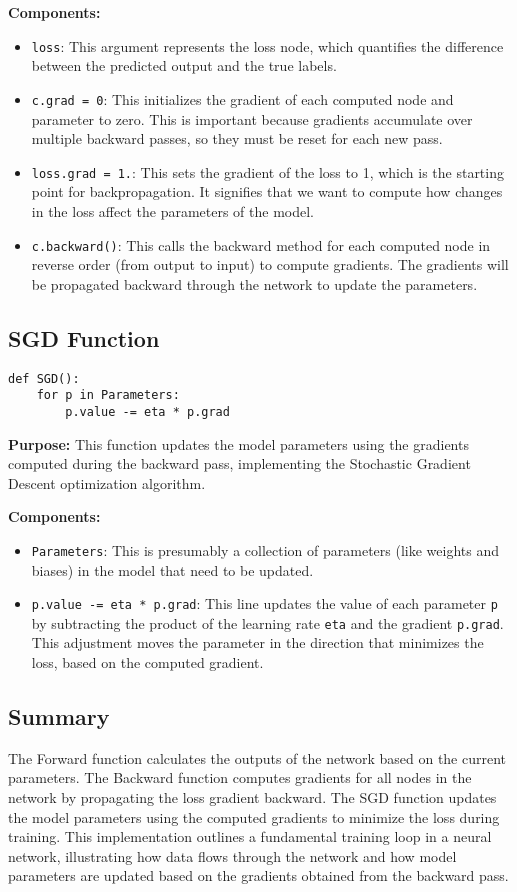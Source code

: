 \documentclass{article}
\begin{document}
\textbf{Components:}
\begin{itemize}
    \item \texttt{loss}: This argument represents the loss node, which quantifies the difference between the predicted output and the true labels.
    \item \texttt{c.grad = 0}: This initializes the gradient of each computed node and parameter to zero. This is important because gradients accumulate over multiple backward passes, so they must be reset for each new pass.
    \item \texttt{loss.grad = 1.}: This sets the gradient of the loss to 1, which is the starting point for backpropagation. It signifies that we want to compute how changes in the loss affect the parameters of the model.
    \item \texttt{c.backward()}: This calls the backward method for each computed node in reverse order (from output to input) to compute gradients. The gradients will be propagated backward through the network to update the parameters.
\end{itemize}

\subsection{SGD Function}
\begin{verbatim}
def SGD():
    for p in Parameters:
        p.value -= eta * p.grad
\end{verbatim}

\textbf{Purpose:} This function updates the model parameters using the gradients computed during the backward pass, implementing the Stochastic Gradient Descent optimization algorithm. 

\textbf{Components:}
\begin{itemize}
    \item \texttt{Parameters}: This is presumably a collection of parameters (like weights and biases) in the model that need to be updated.
    \item \texttt{p.value -= eta * p.grad}: This line updates the value of each parameter \texttt{p} by subtracting the product of the learning rate \texttt{eta} and the gradient \texttt{p.grad}. This adjustment moves the parameter in the direction that minimizes the loss, based on the computed gradient.
\end{itemize}

\subsection{Summary}
The Forward function calculates the outputs of the network based on the current parameters. The Backward function computes gradients for all nodes in the network by propagating the loss gradient backward. The SGD function updates the model parameters using the computed gradients to minimize the loss during training. This implementation outlines a fundamental training loop in a neural network, illustrating how data flows through the network and how model parameters are updated based on the gradients obtained from the backward pass. 
\end{document}
